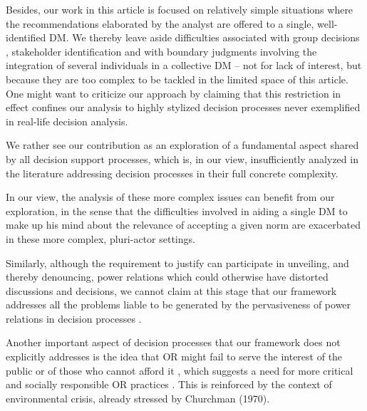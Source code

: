 \documentclass[preprint, french, english, 11pt, authoryear]{elsarticle}%
\begin{document}
Besides, our work in this article is focused on relatively simple situations where the recommendations elaborated by the analyst are offered to a single, well-identified \ac{DM}.
We thereby leave aside difficulties associated with group decisions \citep{jackson_towards_1984}, stakeholder identification \citep{wang_systemic_2015} and with boundary judgments involving the integration of several individuals in a collective \ac{DM} \citep{midgley_systemic_2000}
-- not for lack of interest, but because they are too complex to be tackled in the limited space of this article. One might want to criticize our approach by claiming that this restriction in effect confines our analysis to highly stylized decision processes never exemplified in real-life decision analysis.
\begin{changebar}We rather see our contribution as an exploration of a fundamental aspect shared by all decision support processes, which is, in our view, insufficiently analyzed in the literature addressing decision processes in their full concrete complexity.\end{changebar}
In our view, the analysis of these more complex issues can benefit from our exploration, in the sense that the difficulties involved in aiding a single \ac{DM} to make up his mind about the relevance of accepting a given norm are exacerbated in these more complex, pluri-actor settings. 
\begin{changebar}Similarly, although the requirement to justify can participate in unveiling, and thereby denouncing, power relations which could otherwise have distorted discussions and decisions, 
we cannot claim at this stage that our framework addresses all the problems liable to be generated by the pervasiveness of power relations in decision processes \citep{cronin_issues_2014}.\end{changebar}
Another important aspect of decision processes that our framework does not explicitly addresses is the idea that \ac{OR} might fail to serve the interest of the public or of those who cannot afford it \citep{rosenhead_report_1986}, 
which suggests a need for more critical and socially responsible OR practices \citep{jackson_systems_2000,ulrich_beyond_2003}. This is reinforced by the context of environmental crisis, already stressed by Churchman (1970).
\end{document}
